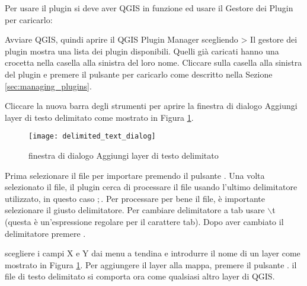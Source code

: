 Per usare il plugin si deve aver QGIS in funzione ed usare il Gestore dei Plugin per caricarlo:

Avviare QGIS, quindi aprire il QGIS Plugin Manager scegliendo  > 
Il gestore dei plugin mostra una lista dei plugin disponibili. Quelli già caricati hanno una crocetta nella casella alla sinistra del loro nome.
Cliccare sulla casella alla sinistra del plugin  e premere il pulsante  per caricarlo come descritto nella Sezione \ref{sec:managing_plugins}.

Cliccare la nuova barra degli strumenti  per aprire la finestra di dialogo Aggiungi layer di testo delimitato come mostrato in Figura
\ref{fig:delim_text_plugin_dialog}.

\begin{figure}[ht]
   \begin{center}
   \caption{finestra di dialogo Aggiungi layer di testo delimitato \nixcaption}\label{fig:delim_text_plugin_dialog}\smallskip
   \texttt{[image: delimited\_text\_dialog]}
   \end{center}
\end{figure}

Prima selezionare il file  per importare premendo il pulsante . Una volta selezionato il file, il plugin cerca di processare il file usando l'ultimo delimitatore utilizzato, in questo caso \mbox{$;$}. Per processare per bene il file, è importante selezionare il giusto delimitatore. Per cambiare delimitatore a tab usare \mbox{$\backslash$}t (questa è un'espressione regolare per il carattere tab).
Dopo aver cambiato il delimitatore premere .

scegliere i campi X e Y dai menu a tendina e introdurre il nome di un layer  
come mostrato in Figura \ref{fig:delim_text_plugin_dialog}. Per aggiungere il layer alla mappa, premere il pulsante . il file di testo delimitato si comporta ora come qualsiasi altro layer di QGIS.
